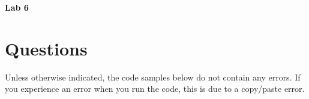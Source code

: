 \documentclass{article}
\begin{document}
\fancyfoot[C]{\thepage}
\vspace*{0cm}
\begin{center}
	{\LARGE \textbf{Lab 6}}\\
	\vspace{.25cm}
\end{center}
\section*{Questions}
Unless otherwise indicated, the code samples below do not contain any errors. If you experience an error when you run the code, this is due to a copy/paste error.
\end{document}
